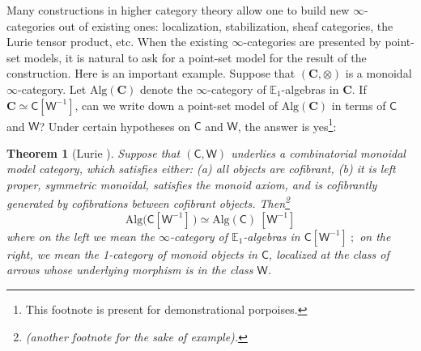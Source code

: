 \documentclass{proc-l}
\theoremstyle{plain}
\newtheorem{theorem}{Theorem}[section]
\theoremstyle{definition}
\theoremstyle{remark}
\begin{document}
Many constructions in higher category theory allow one to build new $\infty$-categories out of existing ones: localization, stabilization, sheaf categories, the Lurie tensor product, etc. When the existing $\infty$-categories are presented by point-set models, it is natural to ask for a point-set model for the result of the construction. Here is an important example. Suppose that $(\mathbf C, \otimes)$ is a {monoidal} $\infty$-category. Let $\mathrm{Alg}(\mathbf C)$ denote the $\infty$-category of $\mathbb E_1$-algebras in $\mathbf C$. If $\mathbf C \simeq \mathsf C[\mathsf W^{-1}]$, can we write down a point-set model of $\mathrm{Alg}(\mathbf C)$ in terms of $\mathsf C$ and $\mathsf W$? Under certain hypotheses on $\mathsf C$ and $\mathsf W$, the answer %
is yes\footnote{This footnote is present for demonstrational porpoises.}:

\begin{theorem}[{Lurie%
}]%
\label{Theorem:1.1} \label{lurie theorem} Suppose that $(\mathsf C,\mathsf W)$ underlies a combinatorial monoidal model category, which %
satisfies either: (a) %
all objects %
are cofibrant, (b) %
it is left proper, symmetric monoidal, satisfies the monoid axiom, and is cofibrantly generated by cofibrations between cofibrant objects. %
Then\footnote{(another footnote for the sake of example).}
\begin{equation}
\label{eq: lurie equivalence}\mathrm{Alg}\big(\mathsf C[\mathsf W^{-1}]\, \big) \simeq \mathrm{Alg}(\mathsf C)~[\mathsf W^{-1}]
\end{equation}%
where on %
the left we mean the $\infty$-category of $\mathbb E_1$-algebras %
in $\mathsf C[\mathsf W^{-1}]~;$ on %
the right, we mean the 1-category of monoid objects in $\mathsf C$, localized at the class of arrows whose underlying morphism is in the class $\mathsf W$.
\end{theorem}
\end{document}
